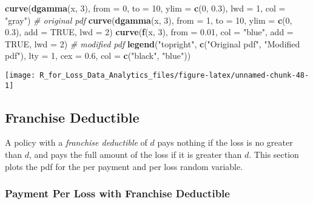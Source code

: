 \documentclass[]{book}
\newenvironment{Shaded}{\begin{snugshade}}{\end{snugshade}}
\newcommand{\KeywordTok}[1]{\textcolor[rgb]{0.13,0.29,0.53}{\textbf{#1}}}
\newcommand{\DataTypeTok}[1]{\textcolor[rgb]{0.13,0.29,0.53}{#1}}
\newcommand{\DecValTok}[1]{\textcolor[rgb]{0.00,0.00,0.81}{#1}}
\newcommand{\FloatTok}[1]{\textcolor[rgb]{0.00,0.00,0.81}{#1}}
\newcommand{\StringTok}[1]{\textcolor[rgb]{0.31,0.60,0.02}{#1}}
\newcommand{\CommentTok}[1]{\textcolor[rgb]{0.56,0.35,0.01}{\textit{#1}}}
\newcommand{\OtherTok}[1]{\textcolor[rgb]{0.56,0.35,0.01}{#1}}
\newcommand{\NormalTok}[1]{#1}
\theoremstyle{definition}
\theoremstyle{definition}
\theoremstyle{definition}
\theoremstyle{remark}
\begin{document}
\begin{Shaded}
\begin{Highlighting}[]
\KeywordTok{curve}\NormalTok{(}\KeywordTok{dgamma}\NormalTok{(x, }\DecValTok{3}\NormalTok{), }\DataTypeTok{from =} \DecValTok{0}\NormalTok{, }\DataTypeTok{to =} \DecValTok{10}\NormalTok{, }\DataTypeTok{ylim =} \KeywordTok{c}\NormalTok{(}\DecValTok{0}\NormalTok{, }\FloatTok{0.3}\NormalTok{), }
      \DataTypeTok{lwd =} \DecValTok{1}\NormalTok{, }\DataTypeTok{col =} \StringTok{"gray"}\NormalTok{)  }\CommentTok{# original pdf}
\KeywordTok{curve}\NormalTok{(}\KeywordTok{dgamma}\NormalTok{(x, }\DecValTok{3}\NormalTok{), }\DataTypeTok{from =} \DecValTok{1}\NormalTok{, }\DataTypeTok{to =} \DecValTok{10}\NormalTok{, }\DataTypeTok{ylim =} \KeywordTok{c}\NormalTok{(}\DecValTok{0}\NormalTok{, }\FloatTok{0.3}\NormalTok{), }\DataTypeTok{add =} \OtherTok{TRUE}\NormalTok{, }\DataTypeTok{lwd =} \DecValTok{2}\NormalTok{)}
\KeywordTok{curve}\NormalTok{(}\KeywordTok{f}\NormalTok{(x, }\DecValTok{3}\NormalTok{), }\DataTypeTok{from =} \FloatTok{0.01}\NormalTok{, }\DataTypeTok{col =} \StringTok{"blue"}\NormalTok{, }\DataTypeTok{add =} \OtherTok{TRUE}\NormalTok{, }\DataTypeTok{lwd =} \DecValTok{2}\NormalTok{)  }\CommentTok{# modified pdf}
\KeywordTok{legend}\NormalTok{(}\StringTok{"topright"}\NormalTok{, }\KeywordTok{c}\NormalTok{(}\StringTok{"Original pdf"}\NormalTok{, }\StringTok{"Modified pdf"}\NormalTok{), }
       \DataTypeTok{lty =} \DecValTok{1}\NormalTok{, }\DataTypeTok{cex =} \FloatTok{0.6}\NormalTok{, }\DataTypeTok{col =} \KeywordTok{c}\NormalTok{(}\StringTok{"black"}\NormalTok{, }\StringTok{"blue"}\NormalTok{))}
\end{Highlighting}
\end{Shaded}

\begin{center}\texttt{[image: R\_for\_Loss\_Data\_Analytics\_files/figure-latex/unnamed-chunk-48-1]} \end{center}

\subsection{Franchise Deductible}\label{franchise-deductible}

A policy with a \emph{franchise deductible} of \(d\) pays nothing if the
loss is no greater than \(d\), and pays the full amount of the loss if
it is greater than \(d\). This section plots the pdf for the per payment
and per loss random variable.

\subsubsection{Payment Per Loss with Franchise
Deductible}\label{payment-per-loss-with-franchise-deductible}
\end{document}
